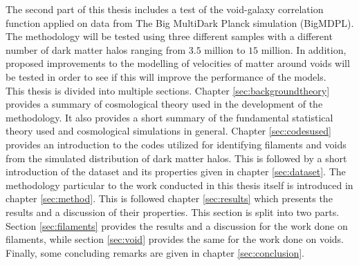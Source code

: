 The second part of this thesis includes a test of the void-galaxy correlation function applied on data from The Big MultiDark Planck simulation (BigMDPL)\cite{Multidark_dataset}. The methodology will be tested using three different samples with a different number of dark matter halos ranging from $3.5$ million to $15$ million. In addition, proposed improvements to the modelling of velocities of matter around voids\cite{Achitouv_streaming} will be tested in order to see if this will improve the performance of the models.\\\indent
This thesis is divided into multiple sections. Chapter \ref{sec:backgroundtheory} provides a summary of cosmological theory used in the development of the methodology. It also provides a short summary of the fundamental statistical theory used and cosmological simulations in general. Chapter \ref{sec:codesused} provides an introduction to the codes utilized for identifying filaments and voids from the simulated distribution of dark matter halos. This is followed by a short introduction of the dataset and its properties given in chapter \ref{sec:dataset}. The methodology particular to the work conducted in this thesis itself is introduced in chapter \ref{sec:method}. This is followed chapter \ref{sec:results} which presents the results and a discussion of their properties. This section is split into two parts. Section \ref{sec:filaments} provides the results and a discussion for the work done on filaments, while section \ref{sec:void} provides the same for the work done on voids. Finally, some concluding remarks are given in chapter \ref{sec:conclusion}. 